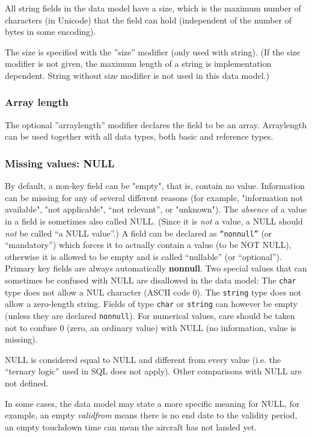 \documentclass[techdoc]{nobs}   %
\begin{document}
All string fields in the data model have a size,
which is the maximum number of characters (in Unicode) that the field can hold
(independent of the number of bytes in some encoding).

The size is specified with the ''size'' modifier (only used with string).
(If the size modifier is not given, the maximum length of a string is
implementation dependent.
String without size modifier is not used in this data model.)

\subsubsection{Array length}
\label{sec:Array length}

The optional ''arraylength'' modifier declares the field to be an array.
Arraylength can be used together with all data types, both basic and
reference types.


\subsubsection{Missing values: NULL}
\label{sec:Missing values}

By default, a non-key field can be "empty", that is, contain no value.
Information can be missing for any of several different reasons
(for example, "information not available", "not applicable",
``not relevant'', or "unknown").
The {\it absence} of a value in a field is sometimes also called NULL.
(Since it is {\em not} a value, a NULL should {\em not} be called ``a NULL value''.)
A field can be declared as {\tt ``nonnull''} (or ``mandatory'')
which forces it to actually contain a value (to be NOT NULL),
otherwise it is allowed to be empty and is called ``nullable'' (or ``optional'').
Primary key fields are always automatically {\bf nonnull}.
Two special values that can sometimes be confused with NULL
are disallowed in the data model:
The {\tt char} type does not allow a NUL character (ASCII code 0).
The {\tt string} type does not allow a zero-length string.
Fields of type {\tt char} or {\tt string} can however be
empty (unless they are declared {\tt nonnull}).
For numerical values, care should be taken not to confuse 0 (zero, an
ordinary value) with NULL (no information, value is missing).

NULL is considered equal to NULL and different from every value
(i.e. the ``ternary logic'' used in SQL does not apply).
Other comparisons with NULL are not defined.

In some cases, the data model may state a more specific meaning
for NULL, for example, an empty {\it validfrom} means there is no end
date to the validity period, an empty touchdown time can mean
the aircraft has not landed yet.
\end{document}
